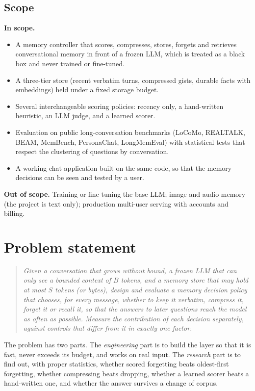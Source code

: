 \subsection{Scope}
\textbf{In scope.}
\begin{itemize}
\item A memory controller that scores, compresses, stores, forgets and
  retrieves conversational memory in front of a frozen LLM, which is treated
  as a black box and never trained or fine-tuned.
\item A three-tier store (recent verbatim turns, compressed gists, durable
  facts with embeddings) held under a fixed storage budget.
\item Several interchangeable scoring policies: recency only, a hand-written
  heuristic, an LLM judge, and a learned scorer.
\item Evaluation on public long-conversation benchmarks (LoCoMo, REALTALK,
  BEAM, MemBench, PersonaChat, LongMemEval) with statistical tests that
  respect the clustering of questions by conversation.
\item A working chat application built on the same code, so that the memory
  decisions can be seen and tested by a user.
\end{itemize}

\textbf{Out of scope.} Training or fine-tuning the base LLM; image and audio
memory (the project is text only); production multi-user serving with
accounts and billing.

\section{Problem statement}

\begin{quote}
\emph{Given a conversation that grows without bound, a frozen LLM that can
only see a bounded context of $B$ tokens, and a memory store that may hold at
most $S$ tokens (or bytes), design and evaluate a memory decision policy that
chooses, for every message, whether to keep it verbatim, compress it, forget
it or recall it, so that the answers to later questions reach the model as
often as possible. Measure the contribution of each decision separately,
against controls that differ from it in exactly one factor.}
\end{quote}

The problem has two parts. The \emph{engineering} part is to build the layer
so that it is fast, never exceeds its budget, and works on real input. The
\emph{research} part is to find out, with proper statistics, whether
scored forgetting beats oldest-first forgetting, whether compressing beats
dropping, whether a learned scorer beats a hand-written one, and whether the
answer survives a change of corpus.

